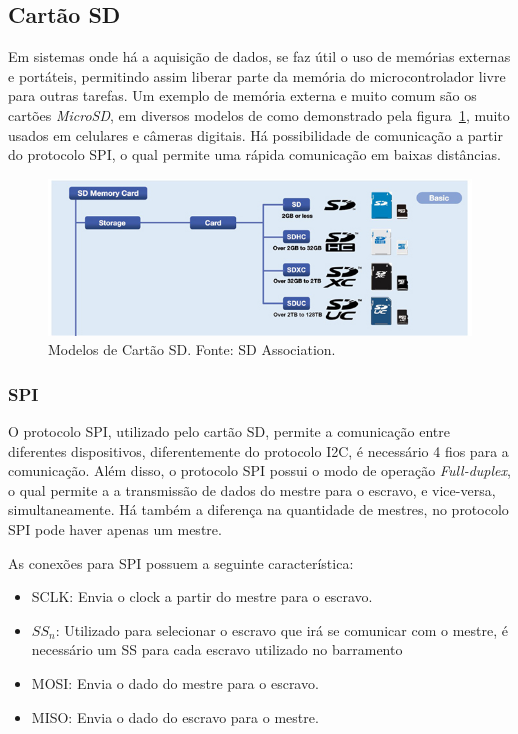 \subsection{Cartão SD}

Em sistemas onde há a aquisição de dados, se faz útil o uso de memórias externas e portáteis, permitindo assim liberar parte da memória do microcontrolador livre para outras tarefas. Um exemplo de memória externa e muito comum são os cartões \textit{MicroSD}, em diversos modelos de como demonstrado pela figura~\ref{fig:SD1}, muito usados em celulares e câmeras digitais. Há possibilidade de comunicação a partir do protocolo SPI, o qual permite uma rápida comunicação em baixas distâncias.

\FloatBarrier
\begin{figure}[!htbp]
	\centering
	\includegraphics[scale=0.7]{imagens/SDCARD}
	\caption{Modelos de Cartão SD. Fonte: SD Association. %
	}
	\label{fig:SD1}
\end{figure}
\FloatBarrier

\subsubsection{SPI}

O protocolo SPI, utilizado pelo cartão SD, permite a comunicação entre diferentes dispositivos, diferentemente do protocolo I2C, é necessário 4 fios para a comunicação. Além disso, o protocolo SPI possui o modo de operação \textit{Full-duplex}, o qual permite a a transmissão de dados do mestre para o escravo, e vice-versa, simultaneamente. Há também a diferença na quantidade de mestres, no protocolo SPI pode haver apenas um mestre.

As conexões para SPI possuem a seguinte característica:
\begin{itemize}
	\item SCLK: Envia o clock a partir do mestre para o escravo.
	\item $SS_n$: Utilizado para selecionar o escravo que irá se comunicar com o mestre, é necessário um SS para cada escravo utilizado no barramento 
	\item MOSI: Envia o dado do mestre para o escravo.
	\item MISO: Envia o dado do escravo para o mestre.
\end{itemize}



